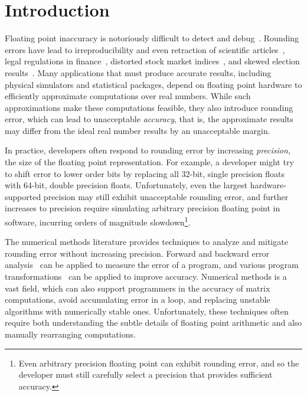 \documentclass[paper.tex]{subfiles}
\begin{document}
\section{Introduction}
\label{sec:introduction}

Floating point inaccuracy is notoriously difficult to detect and
debug~\cite{berkeley00-needle-like, kahan-java-hurts}.  Rounding
errors have lead to irreproducibility and even retraction of
scientific articles~\cite{num-issues-in-stat, num-replication,
  stat-robustness}, legal regulations in finance~\cite{euro-rounding},
distorted stock market indices~\cite{distort-stock,
  wall-street-distort-stock}, and skewed election
results~\cite{round-elections}.  Many applications that must produce
accurate results, including physical simulators and statistical
packages, depend on floating point hardware to efficiently approximate
computations over real numbers.  While such approximations make these
computations feasible, they also introduce rounding error, which can
lead to unacceptable \textit{accuracy}, that is, the approximate
results may differ from the ideal real number results by an
unacceptable margin.


In practice, developers often respond to rounding error by increasing
\textit{precision}, the size of the floating point representation.
For example, a developer might try to shift error to lower order bits
by replacing all 32-bit, single precision floats with 64-bit, double
precision floats.  Unfortunately, even the largest hardware-supported
precision may still exhibit unacceptable rounding error, and further
increases to precision require simulating arbitrary precision floating
point in software, incurring orders of magnitude
slowdown\footnote{Even arbitrary precision floating point can exhibit
  rounding error, and so the developer must still carefully select a
  precision that provides sufficient accuracy.}.

The numerical methods literature provides techniques to analyze and
mitigate rounding error without increasing precision.  Forward and
backward error analysis~\cite{higham-book, kahan-error-survey} can be
applied to measure the error of a program, and various program
transformations~\cite{book87-nmse} can be applied to improve accuracy.
Numerical methods is a vast field, which can also support programmers
in the accuracy of matrix computations, avoid accumulating error in a
loop, and replacing unstable algorithms with numerically stable ones.
Unfortunately, these techniques often require both understanding the
subtle details of floating point arithmetic and also manually
rearranging computations.
\end{document}

